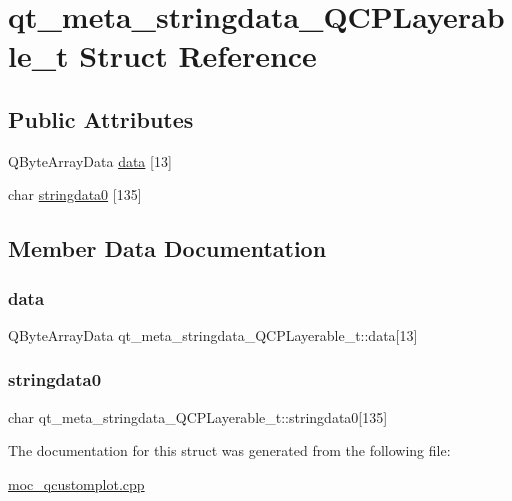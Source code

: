 \hypertarget{structqt__meta__stringdata__QCPLayerable__t}{}\section{qt\+\_\+meta\+\_\+stringdata\+\_\+\+Q\+C\+P\+Layerable\+\_\+t Struct Reference}
\label{structqt__meta__stringdata__QCPLayerable__t}
\subsection*{Public Attributes}
\begin{DoxyCompactItemize}
\item 
Q\+Byte\+Array\+Data \mbox{\hyperlink{structqt__meta__stringdata__QCPLayerable__t_adaa7771b25eb1d5dc6cb97526d7a4995}{data}} \mbox{[}13\mbox{]}
\item 
char \mbox{\hyperlink{structqt__meta__stringdata__QCPLayerable__t_a63a3660ec480a3586f023e4d498cee3d}{stringdata0}} \mbox{[}135\mbox{]}
\end{DoxyCompactItemize}


\subsection{Member Data Documentation}
\mbox{\label{structqt__meta__stringdata__QCPLayerable__t_adaa7771b25eb1d5dc6cb97526d7a4995}} 
\subsubsection{\texorpdfstring{data}{data}}
{\footnotesize\ttfamily Q\+Byte\+Array\+Data qt\+\_\+meta\+\_\+stringdata\+\_\+\+Q\+C\+P\+Layerable\+\_\+t\+::data\mbox{[}13\mbox{]}}

\mbox{\label{structqt__meta__stringdata__QCPLayerable__t_a63a3660ec480a3586f023e4d498cee3d}} 
\subsubsection{\texorpdfstring{stringdata0}{stringdata0}}
{\footnotesize\ttfamily char qt\+\_\+meta\+\_\+stringdata\+\_\+\+Q\+C\+P\+Layerable\+\_\+t\+::stringdata0\mbox{[}135\mbox{]}}



The documentation for this struct was generated from the following file\+:\begin{DoxyCompactItemize}
\item 
\mbox{\hyperlink{moc__qcustomplot_8cpp}{moc\+\_\+qcustomplot.\+cpp}}\end{DoxyCompactItemize}

